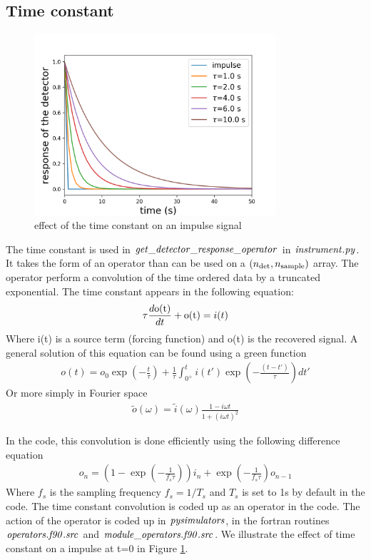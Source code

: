 \documentclass[a4paper, 11pt]{article}
\def\ba{\begin{eqnarray}}
\def\ea{\end{eqnarray}}
\begin{document}
\subsection{Time constant}

\begin{figure}
  \centering
  \includegraphics[width=0.8\textwidth]{time_constant.png}
  \caption{effect of the time constant on an impulse signal}
  \label{fig:time_constant}
\end{figure}

The time constant is used in $\it{get\_detector\_response\_operator}$  in $\it{instrument.py}$.
It  takes the form of an operator than can be used on a $(n_{\rm det}, n_{\rm sample})$ array.
The operator perform a convolution of the time ordered data by a truncated exponential.
The time constant appears in the following equation:
\ba
\tau \frac{d{\rm o(t)}}{dt}+ {\rm o(t)}= i(t)
\ea
Where i(t) is a source term (forcing function) and o(t) is the recovered signal. A general solution of this equation can be found using a green function
\ba
o(t)= o_0 \exp \left(-\frac{t}{\tau} \right) + \frac{1}{\tau} \int^{t}_{0^{+}} i(t') \exp \left( -\frac{(t-t')}{\tau} \right) dt'
\ea
Or more simply in Fourier space
\ba
\tilde{o}(\omega)=\tilde{i}(\omega) \frac{ 1-i\omega t }{ 1+ (i\omega t)^{2}}
\ea

In the code, this convolution is done efficiently using the following difference equation
\ba
o_{n}=(1- \exp(-\frac{1}{f_{s}\tau})) i_{n}  + \exp(-\frac{1}{f_{s}\tau})o_{n-1}
\ea 
Where $f_{s}$ is the sampling frequency $f_{s}=1/T_{s}$ and $T_{s}$ is set to 1s by default in the code.
The time constant convolution is coded up as an operator in the code. The action of the operator is coded up in $\it{pysimulators}$, in the fortran routines  $\it{operators.f90.src}$ and $\it{module\_operators.f90.src}$. We illustrate the effect of time constant on a impulse at t=0 in Figure \ref{fig:time_constant}. 
\end{document}
